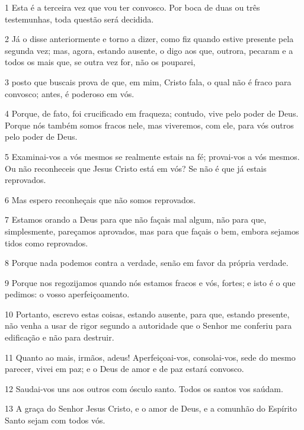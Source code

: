 \par 1 Esta é a terceira vez que vou ter convosco. Por boca de duas ou três testemunhas, toda questão será decidida.
\par 2 Já o disse anteriormente e torno a dizer, como fiz quando estive presente pela segunda vez; mas, agora, estando ausente, o digo aos que, outrora, pecaram e a todos os mais que, se outra vez for, não os pouparei,
\par 3 posto que buscais prova de que, em mim, Cristo fala, o qual não é fraco para convosco; antes, é poderoso em vós.
\par 4 Porque, de fato, foi crucificado em fraqueza; contudo, vive pelo poder de Deus. Porque nós também somos fracos nele, mas viveremos, com ele, para vós outros pelo poder de Deus.
\par 5 Examinai-vos a vós mesmos se realmente estais na fé; provai-vos a vós mesmos. Ou não reconheceis que Jesus Cristo está em vós? Se não é que já estais reprovados.
\par 6 Mas espero reconheçais que não somos reprovados.
\par 7 Estamos orando a Deus para que não façais mal algum, não para que, simplesmente, pareçamos aprovados, mas para que façais o bem, embora sejamos tidos como reprovados.
\par 8 Porque nada podemos contra a verdade, senão em favor da própria verdade.
\par 9 Porque nos regozijamos quando nós estamos fracos e vós, fortes; e isto é o que pedimos: o vosso aperfeiçoamento.
\par 10 Portanto, escrevo estas coisas, estando ausente, para que, estando presente, não venha a usar de rigor segundo a autoridade que o Senhor me conferiu para edificação e não para destruir.
\par 11 Quanto ao mais, irmãos, adeus! Aperfeiçoai-vos, consolai-vos, sede do mesmo parecer, vivei em paz; e o Deus de amor e de paz estará convosco.
\par 12 Saudai-vos uns aos outros com ósculo santo. Todos os santos vos saúdam.
\par 13 A graça do Senhor Jesus Cristo, e o amor de Deus, e a comunhão do Espírito Santo sejam com todos vós.


